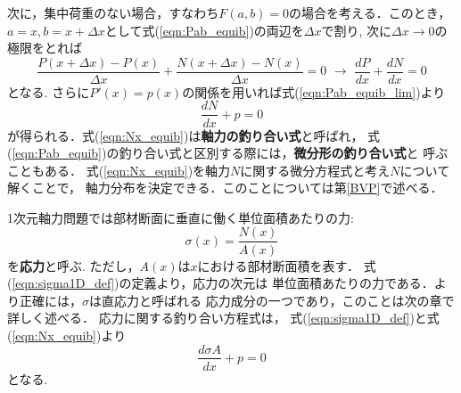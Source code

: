 \documentclass[10pt,a4j]{jbook}
\begin{document}
次に，集中荷重のない場合，すなわち$F(a,b)=0$の場合を考える．このとき，
$a=x, b=x+\Delta x$として式(\ref{eqn:Pab_equib})の両辺を$\Delta x$で割り, 
次に$\Delta x\rightarrow 0$の極限をとれば
\begin{equation}
	\frac{P(x+\Delta x)-P(x)}{\Delta x}+\frac{N(x+\Delta x)-N(x)}{\Delta x}=0 \,\,
	\rightarrow
	\, \,
	\frac{dP}{dx}+\frac{dN}{dx}=0
	\label{eqn:Pab_equib_lim}
\end{equation}
となる. さらに$P'(x)=p(x)$の関係を用いれば式(\ref{eqn:Pab_equib_lim})より
\begin{equation}
	\frac{dN}{dx}+p=0
	\label{eqn:Nx_equib}
\end{equation}
が得られる．式(\ref{eqn:Nx_equib})は{\rm \bf 軸力の釣り合い式}と呼ばれ，
式(\ref{eqn:Pab_equib})の釣り合い式と区別する際には，{\rm \bf 微分形の釣り合い式}と
呼ぶこともある．
式(\ref{eqn:Nx_equib})を軸力$N$に関する微分方程式と考え$N$について解くことで，
軸力分布を決定できる．このことについては第\ref{BVP}で述べる．

1次元軸力問題では部材断面に垂直に働く単位面積あたりの力:
\begin{equation}
	\sigma(x) = \frac{N(x)}{A(x)}
	\label{eqn:sigma1D_def}
\end{equation}
を{\rm \bf 応力}と呼ぶ. ただし，$A(x)$は$x$における部材断面積を表す．
式(\ref{eqn:sigma1D_def})の定義より，応力の次元は
単位面積あたりの力である．より正確には，$\sigma$は直応力と呼ばれる
応力成分の一つであり，このことは次の章で詳しく述べる．
応力に関する釣り合い方程式は，
式(\ref{eqn:sigma1D_def})と式(\ref{eqn:Nx_equib})より
\begin{equation}
	\frac{d\sigma A}{dx}+p=0
	\label{eqn:sigx_equib}
\end{equation}
となる.
\end{document}
